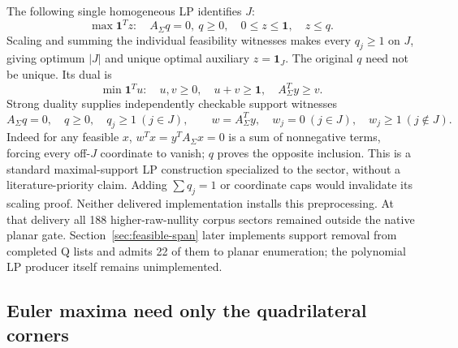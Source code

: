 The following single homogeneous LP identifies $J$:
\[
 \max\mathbf1^Tz:\quad A_\Sigma q=0,\ q\ge0,\quad
                     0\le z\le\mathbf1,\quad z\le q.
\]
Scaling and summing the individual feasibility witnesses makes every
$q_j\ge1$ on $J$, giving optimum $|J|$ and unique optimal auxiliary
$z=\mathbf1_J$. The original $q$ need not be unique. Its dual is
\[
 \min\mathbf1^Tu:\quad u,v\ge0,\quad u+v\ge\mathbf1,\quad
                      A_\Sigma^Ty\ge v.
\]
Strong duality supplies independently checkable support witnesses
\[
 A_\Sigma q=0,\quad q\ge0,\quad q_j\ge1\ (j\in J),\qquad
 w=A_\Sigma^Ty,\quad w_j=0\ (j\in J),\quad w_j\ge1\ (j\notin J).
\]
Indeed for any feasible $x$, $w^Tx=y^TA_\Sigma x=0$ is a sum of
nonnegative terms, forcing every off-$J$ coordinate to vanish; $q$ proves
the opposite inclusion. This is a standard maximal-support LP construction
specialized to the sector, without a literature-priority claim.
Adding $\sum q_j=1$ or coordinate caps would invalidate its scaling proof.
Neither delivered implementation installs this preprocessing. At that
delivery all 188 higher-raw-nullity corpus sectors remained outside the
native planar gate. Section~\ref{sec:feasible-span} later implements support
removal from completed Q lists and admits 22 of them to planar enumeration;
the polynomial LP producer itself remains unimplemented.

\subsection{Euler maxima need only the quadrilateral corners}

